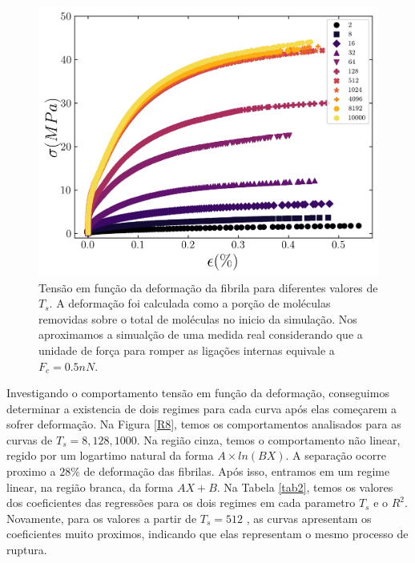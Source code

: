 \documentclass{report}
\begin{document}
        \begin{figure}[H]
            \centering
            \includegraphics[width=\textwidth]{figures/stress_strain.png}

            \caption{Tensão em função da deformação da fibrila para diferentes valores de \(T_{s}\). A deformação foi calculada
            como a porção de moléculas removidas sobre o total de moléculas no inicio da simulação. Nos aproximamos a simualção 
            de uma medida real considerando que a unidade de força para romper as ligações internas equivale a  \( F_{c} = 0.5 nN\).} 

            \label{R5}
        \end{figure}

        Investigando o comportamento tensão em função da deformação, conseguimos determinar a existencia de dois regimes 
        para cada curva após elas começarem a sofrer deformação. Na Figura \ref{R8}, temos os comportamentos analisados para 
        as curvas de \(T_{s} = 8, 128, 1000\). Na região cinza, temos o comportamento não linear, regido por um logartimo 
        natural da forma \(A\times ln(BX)\). A separação ocorre proximo a \(28 \%\) de deformação das fibrilas. Após isso, 
        entramos em um regime linear, na região branca, da forma \(AX + B\). Na Tabela \ref{tab2}, temos os valores dos coeficientes
        das regressões para os dois regimes em cada parametro \(T_{s}\) e o \(R^{2}\). Novamente, para os valores a partir de \(T_{s} = 512\)
        , as curvas apresentam os coeficientes muito proximos, indicando que elas representam o mesmo processo de ruptura.
\end{document}
